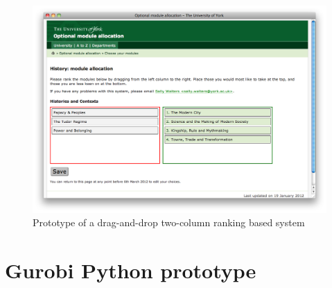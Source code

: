 \documentclass[draft]{scrartcl}
\begin{document}
\begin{figure}
  \begin{center}
    \includegraphics[width=0.85\linewidth]{images/prototypes/student_prototype_3.png}
  \end{center}
  \caption{Prototype of a drag-and-drop two-column ranking based system}
  \label{prototype_student_2col}
\end{figure}

\clearpage
\section{Gurobi Python prototype}
\label{sec:gurobipythonprototype}

\lstset{language=Python}


\clearpage
\printglossaries

\clearpage

\end{document}
